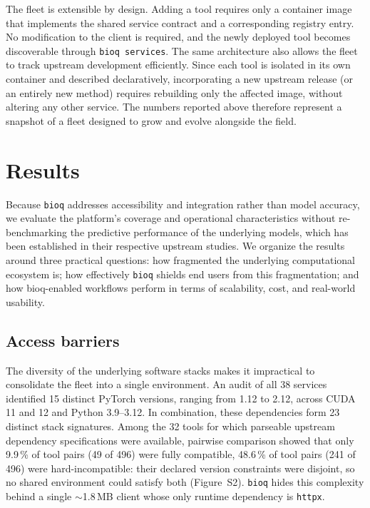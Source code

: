 \documentclass[webpdf,contemporary,large,namedate]{oup-authoring-template}%
\begin{document}
The fleet is extensible by design. Adding a tool requires only a
container image that implements the shared service contract and a
corresponding registry entry. No modification to the client is
required, and the newly deployed tool becomes discoverable through
\texttt{bioq services}. The same architecture also allows the fleet to
track upstream development efficiently. Since each tool is isolated in
its own container and described declaratively, incorporating a new
upstream release (or an entirely new method) requires rebuilding only
the affected image, without altering any other service. The numbers
reported above therefore represent a snapshot of a fleet designed to
grow and evolve alongside the field.

\section{Results}\label{sec:results}

Because \texttt{bioq} addresses accessibility and integration rather
than model accuracy, we evaluate the platform's coverage and
operational characteristics without re-benchmarking the predictive
performance of the underlying models, which has been established in
their respective upstream studies. We organize the results around
three practical questions: how fragmented the underlying computational
ecosystem is; how effectively \texttt{bioq} shields end users from
this fragmentation; and how bioq-enabled workflows perform in terms of
scalability, cost, and real-world usability.


\subsection{Access barriers}\label{sec:access}

The diversity of the underlying software stacks makes it impractical
to consolidate the fleet into a single environment. An audit of all 38
services identified 15 distinct PyTorch versions, ranging from 1.12 to
2.12, across CUDA 11 and 12 and Python 3.9--3.12. In combination,
these dependencies form 23 distinct stack signatures. Among the 32
tools for which parseable upstream dependency specifications were
available, pairwise comparison showed that only 9.9\,\% of tool pairs
(49 of 496) were fully compatible, 48.6\,\% of tool pairs (241 of 496)
were hard-incompatible: their declared version constraints were
disjoint, so no shared environment could satisfy both
(Figure~S2). \texttt{bioq} hides this complexity behind a single
$\sim$1.8\,MB client whose only runtime dependency is \texttt{httpx}.
\end{document}
